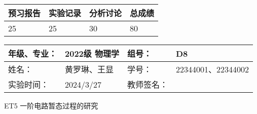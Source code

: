 \documentclass[dvipsnames, svgnames,a4paper,11pt]{article}
\begin{document}
	
	\begin{table}
		\renewcommand\arraystretch{1.7}
		\begin{tabularx}{\textwidth}{
				|X|X|X|X
				|X|X|X|X|}
			\hline
			\multicolumn{2}{|c|}{预习报告}&\multicolumn{2}{|c|}{实验记录}&\multicolumn{2}{|c|}{分析讨论}&\multicolumn{2}{|c|}{总成绩}\\
			\hline
			\LARGE25 & & \LARGE25 & & \LARGE30 & & \LARGE80 & \\
			\hline
		\end{tabularx}
	\end{table}
	
	\begin{table}
		\renewcommand\arraystretch{1.7}
		\begin{tabularx}{\textwidth}{|X|X|X|X|}
			\hline
			年级、专业： & 2022级 物理学 &组号： &D8 \\
			\hline
			姓名： &  黄罗琳、王显  & 学号： &22344001、22344002   \\
			\hline
			实验时间： & 2024/3/27 & 教师签名： & \\
			\hline
		\end{tabularx}
	\end{table}
	
	\begin{center}
		\LARGE ET5 \quad 一阶电路暂态过程的研究
	\end{center}
	
	
\end{document}
